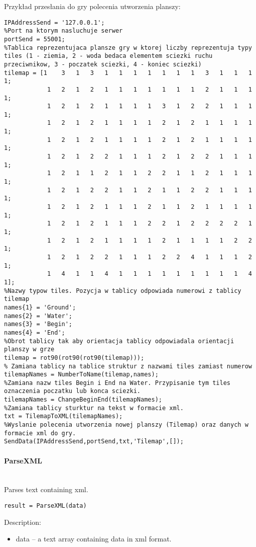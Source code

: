 Przykład przesłania do gry polecenia utworzenia planszy:
\begin{lstlisting}[style=Matlab-editor]
%Adres serwera
IPAddressSend = '127.0.0.1';
%Port na ktorym nasluchuje serwer
portSend = 55001;
%Tablica reprezentujaca plansze gry w ktorej liczby reprezentuja typy tiles (1 - ziemia, 2 - woda bedaca elementem sciezki ruchu przeciwnikow, 3 - poczatek sciezki, 4 - koniec sciezki) 
tilemap = [1	3	1	3	1	1	1	1	1	1	1	3	1	1	1 1;
           	1	2	1	2	1	1	1	1	1	1	1	2	1	1	1 1;
           	1	2	1	2	1	1	1	1	3	1	2	2	1	1	1 1;
           	1	2	1	2	1	1	1	1	2	1	2	1	1	1	1 1;
           	1	2	1	2	1	1	1	1	2	1	2	1	1	1	1 1;
           	1	2	1	2	2	1	1	1	2	1	2	2	1	1	1 1;
           	1	2	1	1	2	1	1	2	2	1	1	2	1	1	1 1;
           	1	2	1	2	2	1	1	2	1	1	2	2	1	1	1 1;
           	1	2	1	2	1	1	1	2	1	1	2	1	1	1	1 1;
           	1	2	1	2	1	1	1	2	2	1	2	2	2	2	1 1;
           	1	2	1	2	1	1	1	1	2	1	1	1	1	2	2 1;
           	1	2	1	2	2	1	1	1	2	2	4	1	1	1	2 1;
           	1	4	1	1	4	1	1	1	1	1	1	1	1	1	4 1];
%Nazwy typow tiles. Pozycja w tablicy odpowiada numerowi z tablicy tilemap
names{1} = 'Ground';
names{2} = 'Water';
names{3} = 'Begin';
names{4} = 'End';
%Obrot tablicy tak aby orientacja tablicy odpowiadala orientacji planszy w grze
tilemap = rot90(rot90(rot90(tilemap)));
% Zamiana tablicy na tablice struktur z nazwami tiles zamiast numerow
tilemapNames = NumberToName(tilemap,names);
%Zamiana nazw tiles Begin i End na Water. Przypisanie tym tiles oznaczenia poczatku lub konca sciezki.
tilemapNames = ChangeBeginEnd(tilemapNames);
%Zamiana tablicy sturktur na tekst w formacie xml.
txt = TilemapToXML(tilemapNames);
%Wyslanie polecenia utworzenia nowej planszy (Tilemap) oraz danych w formacie xml do gry.
SendData(IPAddressSend,portSend,txt,'Tilemap',[]);
\end{lstlisting}

\paragraph{ParseXML} \hspace{0pt} \\
Parses text containing xml.
\begin{lstlisting}[style=Matlab-editor]
result = ParseXML(data)
\end{lstlisting}

Description:
\begin{itemize}
\item data -- a text array containing data in xml format.
\end{itemize}

